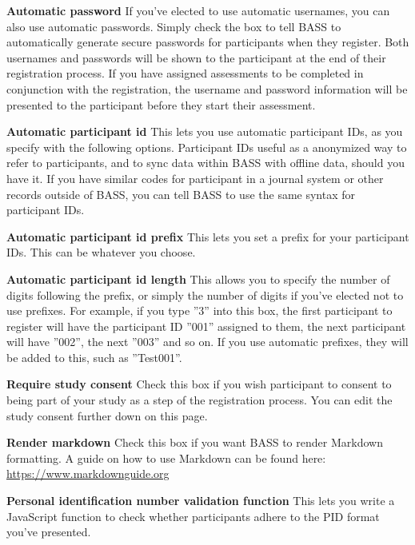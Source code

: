 \documentclass[]{book}
\begin{document}
\textbf{Automatic password}
If you've elected to use automatic usernames, you can also use automatic passwords. Simply check the box to tell BASS to automatically generate secure passwords for participants when they register. Both usernames and passwords will be shown to the participant at the end of their registration process. If you have assigned assessments to be completed in conjunction with the registration, the username and password information will be presented to the participant before they start their assessment.

\textbf{Automatic participant id}
This lets you use automatic participant IDs, as you specify with the following options. Participant IDs useful as a anonymized way to refer to participants, and to sync data within BASS with offline data, should you have it. If you have similar codes for participant in a journal system or other records outside of BASS, you can tell BASS to use the same syntax for participant IDs.

\textbf{Automatic participant id prefix}
This lets you set a prefix for your participant IDs. This can be whatever you choose.

\textbf{Automatic participant id length}
This allows you to specify the number of digits following the prefix, or simply the number of digits if you've elected not to use prefixes. For example, if you type ''3'' into this box, the first participant to register will have the participant ID ''001'' assigned to them, the next participant will have ''002'', the next ''003'' and so on. If you use automatic prefixes, they will be added to this, such as ''Test001''.

\textbf{Require study consent}
Check this box if you wish participant to consent to being part of your study as a step of the registration process. You can edit the study consent further down on this page.

\textbf{Render markdown}
Check this box if you want BASS to render Markdown formatting. A guide on how to use Markdown can be found here: \url{https://www.markdownguide.org}

\textbf{Personal identification number validation function}
This lets you write a JavaScript function to check whether participants adhere to the PID format you've presented.
\end{document}
